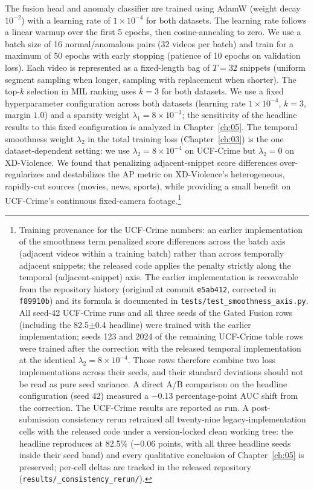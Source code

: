 The fusion head and anomaly classifier are trained using AdamW (weight decay
$10^{-2}$) with a learning rate of $1 \times 10^{-4}$ for both datasets. The
learning rate follows a linear warmup over the first 5 epochs, then
cosine-annealing to zero. We use a batch size of 16 normal/anomalous pairs (32
videos per batch) and train for a maximum of 50 epochs with early stopping
(patience of 10 epochs on validation loss). Each video is represented as a
fixed-length bag of $T=32$ snippets (uniform segment sampling when longer,
sampling with replacement when shorter). The top-$k$ selection in MIL ranking
uses $k=3$ for both datasets. We use a fixed hyperparameter configuration
across both datasets (learning rate $1 \times 10^{-4}$, $k=3$, margin $1.0$)
and a sparsity weight $\lambda_1 = 8 \times 10^{-3}$; the sensitivity of the
headline results to this fixed configuration is analyzed in
Chapter~\ref{ch:05}. The temporal smoothness weight $\lambda_2$ in the total
training loss (Chapter~\ref{ch:03}) is the one dataset-dependent setting: we
use $\lambda_2 = 8 \times 10^{-4}$ on UCF-Crime but $\lambda_2 = 0$ on
XD-Violence. We found that penalizing adjacent-snippet score differences
over-regularizes and destabilizes the AP metric on XD-Violence's
heterogeneous, rapidly-cut sources (movies, news, sports), while providing a
small benefit on UCF-Crime's continuous fixed-camera
footage.\footnote{Training provenance for the UCF-Crime numbers: an earlier
implementation of the smoothness term penalized score differences across the
batch axis (adjacent videos within a training batch) rather than across
temporally adjacent snippets; the released code applies the penalty strictly
along the temporal (adjacent-snippet) axis. The earlier implementation is
recoverable from the repository history (original at commit \texttt{e5ab412},
corrected in \texttt{f89910b}) and its formula is documented in
\texttt{tests/test\_smoothness\_axis.py}. All seed-42 UCF-Crime runs and all
three seeds of the Gated Fusion rows (including the 82.5$\pm$0.4 headline)
were trained with the earlier implementation; seeds 123 and 2024 of the
remaining UCF-Crime table rows were trained after the correction with the
released temporal implementation at the identical
$\lambda_2 = 8 \times 10^{-4}$. Those rows therefore combine two loss
implementations across their seeds, and their standard deviations should not
be read as pure seed variance. A direct A/B comparison on the headline
configuration (seed 42) measured a $-0.13$ percentage-point AUC shift from
the correction. The UCF-Crime results are reported as run. A post-submission
consistency rerun retrained all twenty-nine legacy-implementation cells with
the released code under a version-locked clean working tree: the headline
reproduces at 82.5\% ($-0.06$ points, with all three headline seeds inside
their seed band) and every qualitative conclusion of Chapter~\ref{ch:05} is
preserved; per-cell deltas are tracked in the released repository
(\texttt{results/\_consistency\_rerun/}).}

